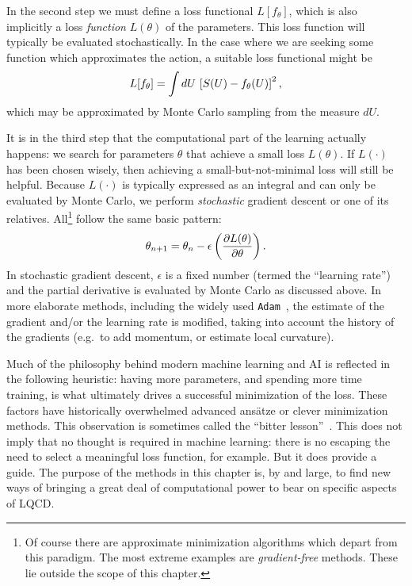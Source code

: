 \documentclass[12pt]{article}
\begin{document}
In the second step we must define a loss functional $L[f_\theta]$, which is also implicitly a loss \emph{function} $L(\theta)$ of the parameters. This loss function will typically be evaluated stochastically. In the case where we are seeking some function which approximates the action, a suitable loss functional might be
\[
L[f_\theta] = \int dU\, \left[S(U) - f_\theta(U)\right]^2\text,
\]
which may be approximated by Monte Carlo sampling from the measure $dU$.

It is in the third step that the computational part of the learning actually happens: we search for parameters $\theta$ that achieve a small loss $L(\theta)$. If $L(\cdot)$ has been chosen wisely, then achieving a small-but-not-minimal loss will still be helpful. Because $L(\cdot)$ is typically expressed as an integral and can only be evaluated by Monte Carlo, we perform \emph{stochastic} gradient descent or one of its relatives. All\footnote{Of course there are approximate minimization algorithms which depart from this paradigm. The most extreme examples are \emph{gradient-free} methods. These lie outside the scope of this chapter.} follow the same basic pattern:
\begin{equation}
    \theta_{n+1} = \theta_{n} - \epsilon \left(\frac{\partial L(\theta)}{\partial \theta}\right)\text.
\end{equation}
In stochastic gradient descent, $\epsilon$ is a fixed number (termed the ``learning rate'') and the partial derivative is evaluated by Monte Carlo as discussed above. In more elaborate methods, including the widely used \texttt{Adam}~\cite{kingma2014adam}, the estimate of the gradient and/or the learning rate is modified, taking into account the history of the gradients (e.g.~to add momentum, or estimate local curvature).

Much of the philosophy behind modern machine learning and AI is reflected in the following heuristic: having more parameters, and spending more time training, is what ultimately drives a successful minimization of the loss. These factors have historically overwhelmed advanced ans\"atze or clever minimization methods. This observation is sometimes called the ``bitter lesson''~\cite{sutton2019bitter}. This does not imply that no thought is required in machine learning: there is no escaping the need to select a meaningful loss function, for example. But it does provide a guide. The purpose of the methods in this chapter is, by and large, to find new ways of bringing a great deal of computational power to bear on specific aspects of LQCD.
\end{document}
